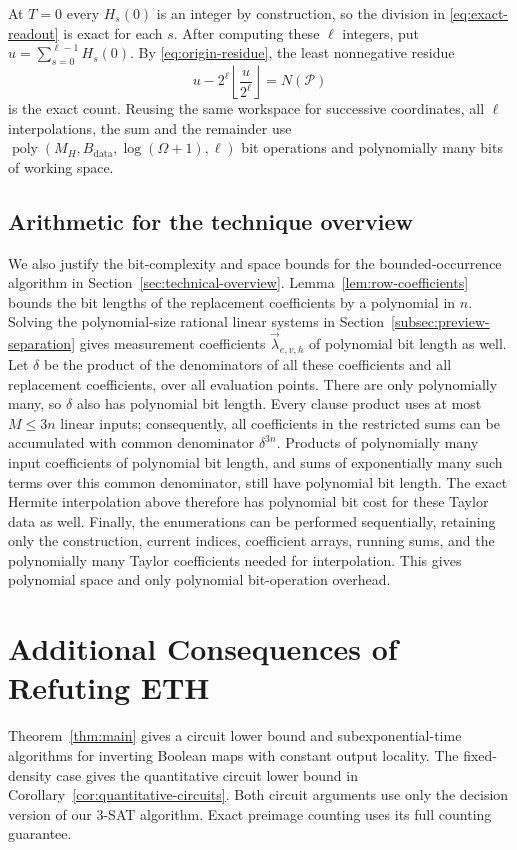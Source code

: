 \documentclass[11pt,reqno]{amsart}
\numberwithin{equation}{section}
\theoremstyle{definition}\newtheorem{definition}[theorem]{Definition}
\theoremstyle{remark}\newtheorem{remark}[theorem]{Remark}
\newcommand{\poly}{\operatorname{poly}}
\renewcommand{\le}{\leqslant}
\begin{document}
At $T=0$ every $H_s(0)$ is an integer by construction, so the
division in \eqref{eq:exact-readout} is exact for each $s$. After
computing these $\ell$ integers, put $u=\sum_{s=0}^{\ell-1}H_s(0)$.
By \eqref{eq:origin-residue}, the least nonnegative residue
\[
 u-2^\ell\left\lfloor\frac{u}{2^\ell}\right\rfloor=N(\mathcal P)
\]
is the exact count. Reusing the same workspace for successive
coordinates, all $\ell$ interpolations, the sum and the remainder
use $\poly(M_H,B_{\mathrm{data}},\log(\Omega+1),\ell)$ bit operations
and polynomially many bits of working space.

\subsection{Arithmetic for the technique overview}
\label{subsec:overview-arithmetic}
We also justify the bit-complexity and space bounds for the
bounded-occurrence algorithm in Section~\ref{sec:technical-overview}.
Lemma~\ref{lem:row-coefficients} bounds the bit lengths of the
replacement coefficients by a polynomial in $n$. Solving the
polynomial-size rational linear systems in
Section~\ref{subsec:preview-separation} gives measurement
coefficients $\vec\lambda_{e,v,h}$ of polynomial bit length as well.
Let $\delta$ be the product of the denominators of all these
coefficients and all replacement coefficients, over all evaluation
points. There are only polynomially many, so $\delta$ also has
polynomial bit length. Every clause product uses at most $M\le3n$
linear inputs; consequently, all coefficients in the restricted
sums can be accumulated with common denominator $\delta^{3n}$.
Products of polynomially many input coefficients of polynomial
bit length, and sums of exponentially many such terms over this
common denominator, still have polynomial bit length. The exact
Hermite interpolation above therefore has polynomial bit cost
for these Taylor data as well. Finally, the enumerations can be
performed sequentially, retaining only the construction, current
indices, coefficient arrays, running sums, and the polynomially
many Taylor coefficients needed for interpolation. This gives
polynomial space and only polynomial bit-operation overhead.

\raggedbottom

\section{Additional Consequences of Refuting ETH}\label{app:consequences}
Theorem~\ref{thm:main} gives a circuit lower bound and
subexponential-time algorithms for inverting Boolean maps with constant
output locality. The fixed-density case gives the quantitative circuit
lower bound in Corollary~\ref{cor:quantitative-circuits}. Both circuit arguments use
only the decision version of our $3$-SAT algorithm. Exact preimage
counting uses its full counting guarantee.
\end{document}
